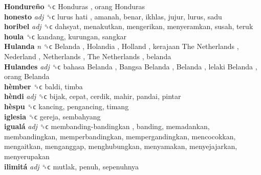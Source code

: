 \textbf{Hondureño} ␝ϲ   Honduras ,  orang Honduras   \\
\textbf{honesto} \emph{adj}  ␝ϲ   lurus hati , amanah, benar, ikhlas, jujur, lurus, sadu  \\
\textbf{horibel} \emph{adj}  ␝ϲ  dahsyat, menakutkan, mengerikan, menyeramkan, susah, teruk  \\
\textbf{houla} ␝ϲ  kandang, kurungan, sangkar  \\
\textbf{Hulanda} \emph{n}  ␝ϲ   Belanda ,  Holandia ,  Holland ,  kerajaan The Netherlands ,  Nederland ,  Netherlands ,  The Netherlands , belanda  \\
\textbf{Hulandes} \emph{adj}  ␝ϲ   bahasa Belanda ,  Bangsa Belanda ,  Belanda ,  lelaki Belanda ,  orang Belanda   \\
\textbf{hèmber} ␝ϲ  baldi, timba  \\
\textbf{hèndi} \emph{adj}  ␝ϲ  bijak, cepat, cerdik, mahir, pandai, pintar  \\
\textbf{hèspu} ␝ϲ  kancing, pengancing, timang  \\
\textbf{iglesia} ␝ϲ  gereja, sembahyang  \\
\textbf{igualá} \emph{adj}  ␝ϲ   membanding-bandingkan , banding, memadankan, membandingkan, memperbandingkan, mempergandingkan, mencocokkan, mengaitkan, menganggap, menghubungkan, menyamakan, menyejajarkan, menyerupakan  \\
\textbf{ilimitá} \emph{adj}  ␝ϲ  mutlak, penuh, sepenuhnya  \\
